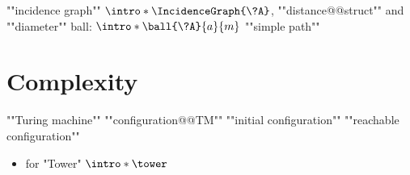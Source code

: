 \begin{itemize}
	\itemAP ""incidence graph"" $\intro*\IncidenceGraph{\?A}$, ""distance@@struct"" and ""diameter""
	\itemAP ball: $\intro*\ball{\?A}{a}{m}$
	\itemAP ""simple path""
\end{itemize}

\section{Complexity}

\begin{itemize}
	\itemAP ""Turing machine""
	\itemAP ""configuration@@TM""
	\itemAP ""initial configuration""
	\itemAP ""reachable configuration""
\end{itemize}

\begin{itemize}
	\itemAP ""Connectivity in Finite Graphs""
	\itemAP ""Reachability in Finite Graphs""
	\itemAP ""computationally equivalent""
	\itemAP ""data complexity""
	\item \cite{Schmitz2016ComplexityHierarchies} for "Tower" $\intro*\tower$
\end{itemize}